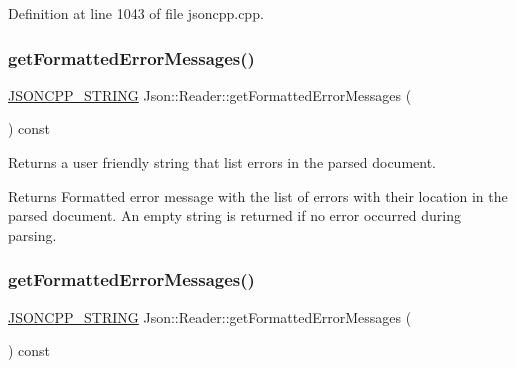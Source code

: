 Definition at line 1043 of file jsoncpp.\+cpp.

\hypertarget{class_json_1_1_reader_ae638a7b1f36f7ccf99ba89fa36ccf222}{}\label{class_json_1_1_reader_ae638a7b1f36f7ccf99ba89fa36ccf222} 
\subsubsection{\texorpdfstring{get\+Formatted\+Error\+Messages()}{getFormattedErrorMessages()}\hspace{0.1cm}{\footnotesize\ttfamily [1/2]}}
{\footnotesize\ttfamily \hyperlink{config_8h_a1e723f95759de062585bc4a8fd3fa4be}{J\+S\+O\+N\+C\+P\+P\+\_\+\+S\+T\+R\+I\+NG} Json\+::\+Reader\+::get\+Formatted\+Error\+Messages (\begin{DoxyParamCaption}{ }\end{DoxyParamCaption}) const}



Returns a user friendly string that list errors in the parsed document. 

\begin{DoxyReturn}{Returns}
Formatted error message with the list of errors with their location in the parsed document. An empty string is returned if no error occurred during parsing. 
\end{DoxyReturn}
\hypertarget{class_json_1_1_reader_ae638a7b1f36f7ccf99ba89fa36ccf222}{}\label{class_json_1_1_reader_ae638a7b1f36f7ccf99ba89fa36ccf222} 
\subsubsection{\texorpdfstring{get\+Formatted\+Error\+Messages()}{getFormattedErrorMessages()}\hspace{0.1cm}{\footnotesize\ttfamily [2/2]}}
{\footnotesize\ttfamily \hyperlink{config_8h_a1e723f95759de062585bc4a8fd3fa4be}{J\+S\+O\+N\+C\+P\+P\+\_\+\+S\+T\+R\+I\+NG} Json\+::\+Reader\+::get\+Formatted\+Error\+Messages (\begin{DoxyParamCaption}{ }\end{DoxyParamCaption}) const}



